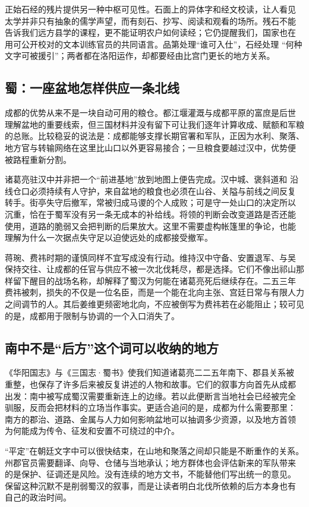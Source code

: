 正始石经的残片提供另一种中枢可见性。石面上的异体字和经文校读，让人看见
太学并非只有抽象的儒学声望，而有刻石、抄写、阅读和观看的场所。残石不能
告诉我们远方县学的课程，更不能证明农户如何读经；它仍提醒我们，国家也在
用可公开校对的文本训练官员的共同语言。品第处理“谁可入仕”，石经处理
“何种文字可被援引”；两者都在洛阳运作，却都要经由比宫门更长的地方关系。

\subsection{蜀：一座盆地怎样供应一条北线}

成都的优势从来不是一块自动可用的粮仓。都江堰灌溉与成都平原的富庶是后世
理解盆地的重要线索，但三国材料并没有留下可让我们逐年计算收成、赋额和军粮
的总账。比较稳妥的说法是：成都能够支撑长期官署和军队，正因为水利、聚落、
地方官与转输网络在这里比山口以外更容易接合；一旦粮食要越过汉中，优势便
被路程重新分割。

诸葛亮驻汉中并非把一个“前进基地”放到地图上便告完成。汉中城、褒斜道和
沿线仓口必须持续有人守护，来自盆地的粮食也必须在山谷、关隘与前线之间反复
转手。街亭失守后撤军，常被归成马谡的个人成败；可是守一处山口的决定所以
沉重，恰在于蜀军没有另一条无成本的补给线。将领的判断会改变道路是否还能
使用，道路的脆弱又会把判断的后果放大。这里不需要虚构帐篷里的争论，也能
理解为什么一次据点失守足以迫使远处的成都接受撤军。

蒋琬、费祎时期的谨慎同样不宜写成没有行动。维持汉中守备、安置退军、与吴
保持交往、让成都的任官与供应不被一次北伐耗尽，都是选择。它们不像出祁山那
样留下醒目的战场名称，却解释了蜀汉为何能在诸葛亮死后继续存在。二五三年
费祎被刺，损失的不仅是一位名臣，而是一个能在北向主张、宫廷日常与有限人力
之间调节的人。其后姜维更频密地北向，不应被倒写为费祎若在必能阻止；较可见
的是，成都用于限制与协调的一个入口消失了。

\subsection{南中不是“后方”这个词可以收纳的地方}

《华阳国志》与《三国志·蜀书》使我们知道诸葛亮二二五年南下、郡县关系被
重整，也保存了许多后来被反复讲述的人物和故事。它们的叙事方向首先从成都
出发：南中被写成蜀汉需要重新连上的边缘。若以此便断言当地社会已经被完全
驯服，反而会把材料的立场当作事实。更适合追问的是，成都为什么需要那里：
南方的郡治、道路、金属与人力如何影响盆地可以抽调多少资源，以及地方首领
为何能成为传令、征发和安置不可绕过的中介。

“平定”在朝廷文字中可以很快结束，在山地和聚落之间却只能是不断重作的关系。
州郡官员需要翻译、向导、仓储与当地承认；地方群体也会评估新来的军队带来
的是保护、征调还是风险。没有连续的地方文书，不能替他们写出统一的意见。
保留这种沉默不是削弱蜀汉的叙事，而是让读者明白北伐所依赖的后方本身也有
自己的政治时间。
